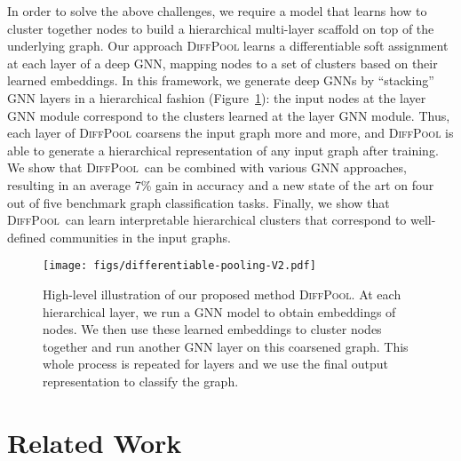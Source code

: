 \documentclass{article}
\newcommand{\jure}[1]{{{\textcolor{red}{[Jure: #1]}}}}
\newcommand{\chris}[1]{{{\textcolor{orange}{[Christopher: #1]}}}}
\newcommand{\will}[1]{{{\textcolor{purple}{[Will: #1]}}}}
\newcommand{\name}{\textsc{DiffPool}\xspace}
\newcommand{\cut}[1]{}
\begin{document}
In order to solve the above challenges, we require a model that learns how to cluster together nodes to build a hierarchical multi-layer scaffold on top of the underlying graph. 
Our approach \name learns a differentiable soft assignment at each layer of a deep GNN, mapping nodes to a set of clusters based on their learned embeddings. 
In this framework, we generate deep GNNs by ``stacking'' GNN layers in a hierarchical fashion (Figure~\ref{fig:illustration}): the input nodes at the layer  GNN module correspond to the clusters learned at the layer  GNN module. 
Thus, each layer of \name coarsens the input graph more and more, and \name is able to generate a hierarchical representation of any input graph after training.
We show that \name\ can be combined with various GNN approaches, resulting in an average 7\% gain in accuracy and a new state of the art on four out of five benchmark graph classification tasks. 
Finally,  we show that \name\ can learn interpretable hierarchical clusters that correspond to well-defined communities in the input graphs.
\cut{
\jure{Say much much more about our method, how it works and why it is cool.}

\chris{Maybe add highlevel visualization of the idea.}

\jure{ I strongly agree, we need a Figure 1 with an illustration of the method.
For example, a graph and then a hierarchical multi-layer scaffold on top of it.
Will, you are great at creating good figures. Do you want to give it a try?}
\will{Yes, I will brainstorm with Rex today about a figure and put something together :)}

\chris{Quickly sketched this. I think it somehow explains the high-level idea. Guess the equations are too much.}
}

\begin{figure}[t]\begin{center}
    \texttt{[image: figs/differentiable-pooling-V2.pdf]}
    \caption{High-level illustration of our proposed method \name. At each hierarchical layer, we run a GNN model to obtain embeddings of nodes. We then use these learned embeddings to cluster nodes together  and run another GNN layer on this coarsened graph. This whole process is repeated for  layers and we use the final output representation to classify the graph. }
    \label{fig:illustration}
    \end{center}
\end{figure}



 \section{Related Work}
\end{document}
